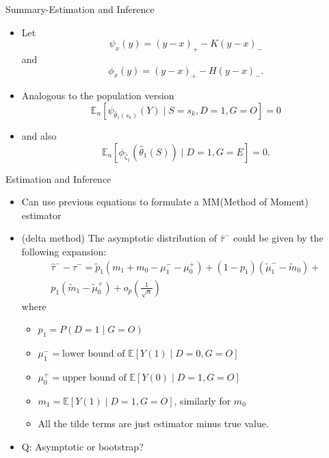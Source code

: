 \documentclass{beamer}					%
\begin{document}
\begin{frame}{Summary-Estimation and Inference}
    \begin{itemize}
    \item Let $$\psi_x(y) = (y - x)_+ - K (y - x)_-$$ and $$\phi_x(y) = (y - x)_+ - H (y - x)_-.$$
    \item Analogous to the population version $$
	\mathbb{E}_n\left[\psi_{\hat{\theta}_1(s_k)}(Y) \mid S = s_k, D=1, G=O\right] = 0
	$$
	\item and also \begin{equation*}
	\mathbb{E}_n\left[\phi_{\hat{\zeta}_1}(\hat{\theta}_1(S)) \mid D=1, G=E\right] = 0.
	\end{equation*}
    \end{itemize}
\end{frame}

\begin{frame}{Estimation and Inference}
    \begin{itemize}
        \item Can use previous equations to formulate a MM(Method of Moment) estimator
        \item (delta method) The asymptotic distribution of $\hat{\tau}^-$ could be given by the following expansion:
        \begin{align*}
            \hat{\tau}^{-} - \tau^- = \tilde{p}_1 (m_1 + m_0 - \mu_1^- - \mu_0^+) + (1- p_1)(\tilde{\mu}_1^- - \tilde{m}_0) + \\p_1 (\tilde{m}_1 - \tilde{\mu}_0^+) + o_p(\frac{1}{\sqrt{n}})
        \end{align*}
where 
    \begin{itemize}
        \item $p_1 = P(D =1 \mid G = O)$ 
        \item $\mu_1^- = \text{lower bound of } \mathbb{E}[Y(1) \mid D = 0, G = O]$
        \item $\mu_0^+ = \text{upper bound of }\mathbb{E}[Y(0) \mid D = 1, G = O]$
        \item $m_1 = \mathbb{E}[Y(1) \mid D = 1, G = O]$, similarly for $m_0$
        \item All the tilde terms are just estimator minus true value.
    \end{itemize}
    \item Q: Asymptotic or bootstrap?
    \end{itemize}
\end{frame}
\end{document}

